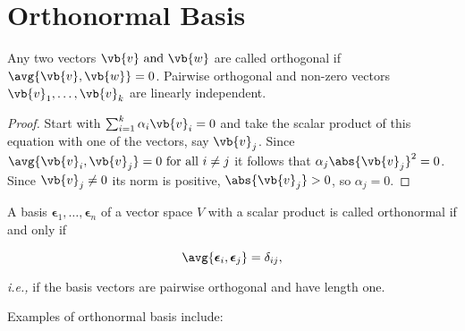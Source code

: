 \documentclass[a4paper,12pt]{report}
\begin{document}
\section{Orthonormal Basis}

\begin{lemma}
Any two vectors \(\vb{v} \text { and } \vb{w} \) are called orthogonal if \(\avg{\vb{v} ,\vb{w} } = 0\). Pairwise orthogonal and non-zero vectors \(\vb{v} _{1}, \hdots , \vb{v} _{k}  \) are linearly independent.  
\end{lemma}

\begin{proof}
Start with \(\sum_{i=1}^{k} \alpha _{i}\vb{v} _{i} = 0 \) and take the scalar product of this equation with one of the vectors, say \(\vb{v} _{j} \). Since \(\avg{\vb{v} _{i} , \vb{v} _{j} } = 0 \text{ for all } i \neq j\) it follows that \(\alpha _{j}\abs{\vb{v} _{j} }^2 = 0  \). Since \(\vb{v} _{j} \neq 0 \) its norm is positive, \(\abs{\vb{v} _{j} } > 0 \), so \(\alpha _{j} = 0 \).       

\end{proof}

\begin{definition}
A basis \(\boldsymbol{\epsilon  }_{1} , \ldots   , \boldsymbol{\epsilon}_{n}    \) of a vector space \(V\) with a scalar product is called orthonormal if and only if

\begin{equation}
    \avg{\boldsymbol{\epsilon }_{i} , \boldsymbol{\epsilon } _{j}   } = \delta _{ij},
\end{equation}

\textit{i.e.,} if the basis vectors are pairwise orthogonal and have length one.

\end{definition}

Examples of orthonormal basis include:
\end{document}
